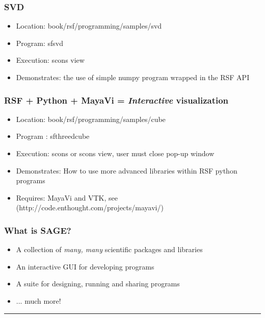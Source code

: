
\begin{frame} \frametitle{ SVD}
\begin{itemize}
\item Location: book/rsf/programming/samples/svd
\item Program: sfsvd
\item Execution: scons view
\item Demonstrates:  the use of simple numpy program wrapped in the RSF API
\end{itemize}
\end{frame}

\begin{frame}\frametitle{RSF + Python + MayaVi = \emph{Interactive} visualization}
\begin{itemize}
\item Location: book/rsf/programming/samples/cube
\item Program : sfthreedcube
\item Execution: scons or scons view, user must close pop-up window
\item Demonstrates:  How to use more advanced libraries within RSF python programs
\item Requires: MayaVi and VTK, see (http://code.enthought.com/projects/mayavi/)
\end{itemize}
\end{frame}

\begin{frame}
\end{frame}

\begin{frame} \frametitle{What is SAGE?}
\begin{itemize}
\item A collection of \emph{many, many} scientific packages and libraries
\item An interactive GUI for developing programs
\item A suite for designing, running and sharing programs
\item ... much more!
\end{itemize}
\hrule
\pause
{}
\end{frame}

